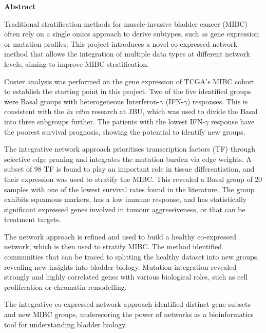 \thispagestyle{plain}
\begin{center}
    \Large        
    \textbf{Abstract}
    \vspace{0.9cm}
\end{center}


Traditional stratification methods for muscle-invasive bladder cancer (MIBC) often rely on a single omics approach to derive subtypes, such as gene expression or mutation profiles. This project introduces a novel co-expressed network method that allows the integration of multiple data types at different network levels, aiming to improve MIBC stratification. 

Custer analysis was performed on the gene expression of TCGA's MIBC cohort to establish the starting point in this project. Two of the five identified groups were Basal groups with heterogeneous Interferon-$\gamma$ (IFN-$\gamma$) responses. This is consistent with the \textit{in vitro} research at JBU, which was used to divide the Basal into three subgroups further. The patients with the lowest IFN-$\gamma$ response have the poorest survival prognosis, showing the potential to identify new groups.


% 
The integrative network approach prioritises transcription factors (TF) through selective edge pruning and integrates the mutation burden via edge weights. A subset of 98 TF is found to play an important role in tissue differentiation, and their expression was used to stratify the MIBC. This revealed a Basal group of 20 samples with one of the lowest survival rates found in the literature. The group exhibits squamous markers, has a low immune response, and has statistically significant expressed genes involved in tumour aggressiveness, or that can be treatment targets.


%
The network approach is refined and used to build a healthy co-expressed network, which is then used to stratify MIBC. The method identified communities that can be traced to splitting the healthy dataset into new groups, revealing new insights into bladder biology. Mutation integration revealed strongly and highly correlated genes with various biological roles, such as cell proliferation or chromatin remodelling.


The integrative co-expressed network approach identified distinct gene subsets and new MIBC groups, underscoring the power of networks as a bioinformatics tool for understanding bladder biology.


\newpage